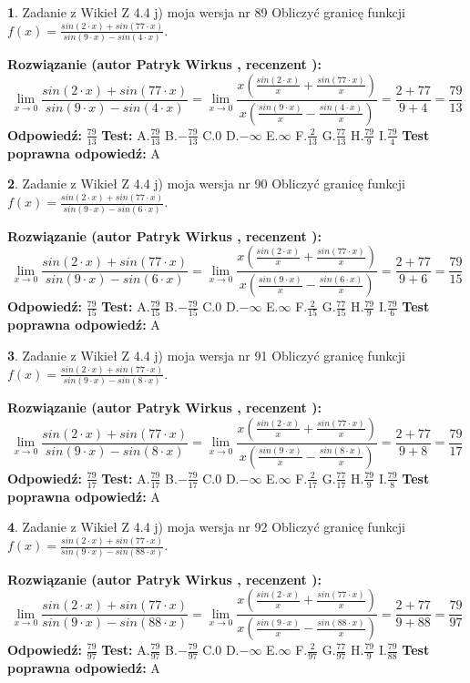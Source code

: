 \documentclass[12pt, a4paper]{article}
\theoremstyle{definition} %
\newtheorem{zad}{}
\newcommand{\zadStart}[1]{\begin{zad}#1\newline}
\newcommand{\zadStop}{\end{zad}}
\newcommand{\rozwStart}[2]{\noindent \textbf{Rozwiązanie (autor #1 , recenzent #2): }\newline}
\newcommand{\rozwStop}{\newline}
\newcommand{\odpStart}{\noindent \textbf{Odpowiedź:}\newline}
\newcommand{\odpStop}{\newline}
\newcommand{\testStart}{\noindent \textbf{Test:}\newline}
\newcommand{\testStop}{\newline}
\newcommand{\kluczStart}{\noindent \textbf{Test poprawna odpowiedź:}\newline}
\newcommand{\kluczStop}{\newline}
\begin{document}
\zadStart{Zadanie z Wikieł Z 4.4 j) moja wersja nr 89}
Obliczyć granicę funkcji $f(x)=\frac{sin(2\cdot x) +sin(77\cdot x)}{sin(9\cdot x) -sin(4\cdot x)}$.
\zadStop
\rozwStart{Patryk Wirkus}{}
$$\lim\limits_{x\to 0}\frac{sin(2\cdot x) +sin(77\cdot x)}{sin(9\cdot x) -sin(4\cdot x)}=\lim\limits_{x\to 0}\frac{x(\frac{sin(2\cdot x)}{x}+\frac{sin(77\cdot x)}{x})}{x(\frac{sin(9\cdot x)}{x}-\frac{sin(4\cdot x)}{x})}=\frac{2+77}{9+4} = \frac{79}{13}$$
\rozwStop
\odpStart
$\frac{79}{13}$
\odpStop
\testStart
A.$\frac{79}{13}$
B.$-\frac{79}{13}$
C.$0$
D.$-\infty$
E.$\infty$
F.$\frac{2}{13}$
G.$\frac{77}{13}$
H.$\frac{79}{9}$
I.$\frac{79}{4}$
\testStop
\kluczStart
A
\kluczStop



\zadStart{Zadanie z Wikieł Z 4.4 j) moja wersja nr 90}
Obliczyć granicę funkcji $f(x)=\frac{sin(2\cdot x) +sin(77\cdot x)}{sin(9\cdot x) -sin(6\cdot x)}$.
\zadStop
\rozwStart{Patryk Wirkus}{}
$$\lim\limits_{x\to 0}\frac{sin(2\cdot x) +sin(77\cdot x)}{sin(9\cdot x) -sin(6\cdot x)}=\lim\limits_{x\to 0}\frac{x(\frac{sin(2\cdot x)}{x}+\frac{sin(77\cdot x)}{x})}{x(\frac{sin(9\cdot x)}{x}-\frac{sin(6\cdot x)}{x})}=\frac{2+77}{9+6} = \frac{79}{15}$$
\rozwStop
\odpStart
$\frac{79}{15}$
\odpStop
\testStart
A.$\frac{79}{15}$
B.$-\frac{79}{15}$
C.$0$
D.$-\infty$
E.$\infty$
F.$\frac{2}{15}$
G.$\frac{77}{15}$
H.$\frac{79}{9}$
I.$\frac{79}{6}$
\testStop
\kluczStart
A
\kluczStop



\zadStart{Zadanie z Wikieł Z 4.4 j) moja wersja nr 91}
Obliczyć granicę funkcji $f(x)=\frac{sin(2\cdot x) +sin(77\cdot x)}{sin(9\cdot x) -sin(8\cdot x)}$.
\zadStop
\rozwStart{Patryk Wirkus}{}
$$\lim\limits_{x\to 0}\frac{sin(2\cdot x) +sin(77\cdot x)}{sin(9\cdot x) -sin(8\cdot x)}=\lim\limits_{x\to 0}\frac{x(\frac{sin(2\cdot x)}{x}+\frac{sin(77\cdot x)}{x})}{x(\frac{sin(9\cdot x)}{x}-\frac{sin(8\cdot x)}{x})}=\frac{2+77}{9+8} = \frac{79}{17}$$
\rozwStop
\odpStart
$\frac{79}{17}$
\odpStop
\testStart
A.$\frac{79}{17}$
B.$-\frac{79}{17}$
C.$0$
D.$-\infty$
E.$\infty$
F.$\frac{2}{17}$
G.$\frac{77}{17}$
H.$\frac{79}{9}$
I.$\frac{79}{8}$
\testStop
\kluczStart
A
\kluczStop



\zadStart{Zadanie z Wikieł Z 4.4 j) moja wersja nr 92}
Obliczyć granicę funkcji $f(x)=\frac{sin(2\cdot x) +sin(77\cdot x)}{sin(9\cdot x) -sin(88\cdot x)}$.
\zadStop
\rozwStart{Patryk Wirkus}{}
$$\lim\limits_{x\to 0}\frac{sin(2\cdot x) +sin(77\cdot x)}{sin(9\cdot x) -sin(88\cdot x)}=\lim\limits_{x\to 0}\frac{x(\frac{sin(2\cdot x)}{x}+\frac{sin(77\cdot x)}{x})}{x(\frac{sin(9\cdot x)}{x}-\frac{sin(88\cdot x)}{x})}=\frac{2+77}{9+88} = \frac{79}{97}$$
\rozwStop
\odpStart
$\frac{79}{97}$
\odpStop
\testStart
A.$\frac{79}{97}$
B.$-\frac{79}{97}$
C.$0$
D.$-\infty$
E.$\infty$
F.$\frac{2}{97}$
G.$\frac{77}{97}$
H.$\frac{79}{9}$
I.$\frac{79}{88}$
\testStop
\kluczStart
A
\kluczStop
\end{document}

